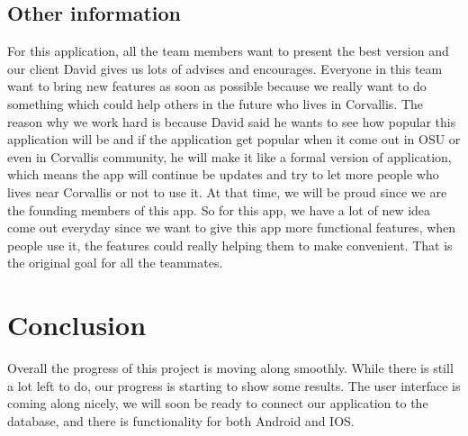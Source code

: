 \documentclass[letterpaper, 10pt,titlepage]{article}
\begin{document}
\subsection{Other information}
For this application, all the team members want to present the best version and our client David gives us lots of advises and encourages. Everyone in this team want to bring new features as soon as possible because we really want to do something which could help others in the future who lives in Corvallis. The reason why we work hard is because David said he wants to see how popular this application will be and if the application get popular when it come out in OSU or even in Corvallis community, he will make it like a formal version of application, which means the app will continue be updates and try to let more people who lives near Corvallis or not to use it. At that time, we will be proud since we are the founding members of this app. So for this app, we have a lot of new idea come out everyday since we want to give this app more functional features, when people use it, the features could really helping them to make convenient. That is the original goal for all the teammates.

\section{Conclusion}
Overall the progress of this project is moving along smoothly. While there is still a lot left to do, our progress is starting to show some results. The user interface is coming along nicely, we will soon be ready to connect our application to the database, and  there is functionality for both Android and IOS.
\end{document}
